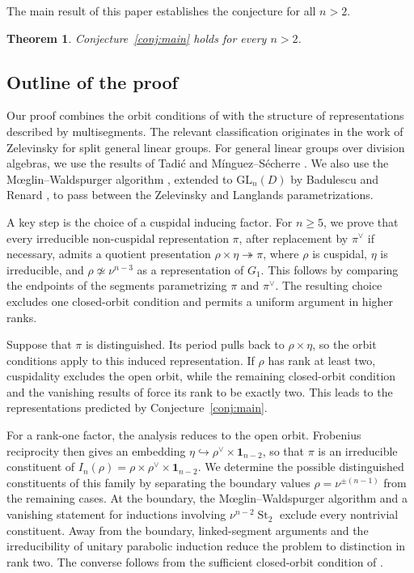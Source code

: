 \documentclass[11pt,leqno]{amsart}
\numberwithin{equation}{section}
\theoremstyle{plain}
\newtheorem{thrm}{Theorem}
\theoremstyle{definition}
\theoremstyle{remark}
\DeclareMathOperator{\St}{St}
\newcommand{\one}{\mathbf{1}}
\begin{document}
	The main result of this paper establishes the conjecture
	for all $n>2$.
	
	\begin{thrm}\label{thm:main}
		Conjecture~\ref{conj:main} holds for every $n>2$.
	\end{thrm}
	
	\subsection*{Outline of the proof}
	
	Our proof combines the orbit conditions of \cite{DSV}
	with the structure of representations described by
	multisegments.
	The relevant classification originates in the work
	of Zelevinsky \cite{Ze80} for split general linear groups.
	For general linear groups over division algebras,
	we use the results of Tadi\'c \cite{Tadic}
	and M\'inguez--S\'echerre \cite{MS13}.
	We also use the M\oe glin--Waldspurger algorithm
	\cite{MW86}, extended to $\mathrm{GL}_n(D)$ by
	Badulescu and Renard \cite{BR07}, to pass between
	the Zelevinsky and Langlands parametrizations.
	
	A key step is the choice of a cuspidal inducing factor.
	For $n\geq 5$, we prove that every irreducible non-cuspidal
	representation $\pi$, after replacement by $\pi^\vee$
	if necessary, admits a quotient presentation
	$\rho\times\eta\twoheadrightarrow\pi$,
	where $\rho$ is cuspidal, $\eta$ is irreducible, and
	$\rho\not\simeq\nu^{n-3}$ as a representation of $G_1$.
	This follows by comparing the endpoints of the segments
	parametrizing $\pi$ and $\pi^\vee$.
	The resulting choice excludes one closed-orbit condition
	and permits a uniform argument in higher ranks.
	
	Suppose that $\pi$ is distinguished.
	Its period pulls back to $\rho\times\eta$, so the orbit
	conditions apply to this induced representation.
	If $\rho$ has rank at least two, cuspidality excludes
	the open orbit, while the remaining closed-orbit condition
	and the vanishing results of \cite{ALMSY24} force its rank
	to be exactly two.
	This leads to the representations predicted by
	Conjecture~\ref{conj:main}.
	
	For a rank-one factor, the analysis reduces to the open
	orbit. Frobenius reciprocity then gives an embedding
	$\eta\hookrightarrow\rho^\vee\times\one_{n-2}$,
	so that $\pi$ is an irreducible constituent of $I_n(\rho)=\rho\times\rho^\vee\times\one_{n-2}$.
	We determine the possible distinguished constituents
	of this family by separating the boundary values
	$\rho=\nu^{\pm(n-1)}$ from the remaining cases.
	At the boundary, the M\oe glin--Waldspurger algorithm
	and a vanishing statement for inductions involving
	$\nu^{n-2}\St_2$ exclude every nontrivial constituent.
	Away from the boundary, linked-segment arguments
	and the irreducibility of unitary parabolic induction
	\cite{Secherre} reduce the problem to distinction in
	rank two.
	The converse follows from the sufficient closed-orbit
	condition of \cite{DSV}.
	
\end{document}
